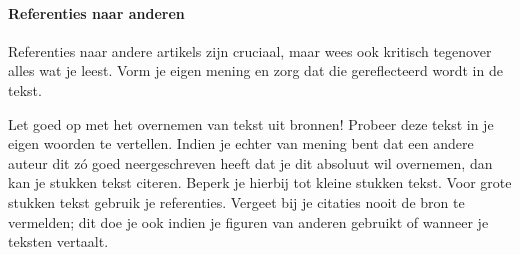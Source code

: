 \documentclass[a4paper]{article}
\begin{document}
\paragraph{Referenties naar anderen}

Referenties naar andere artikels zijn cruciaal, maar wees ook kritisch tegenover alles wat je leest.
Vorm je eigen mening en zorg dat die gereflecteerd wordt in de tekst.

Let goed op met het overnemen van tekst uit bronnen!
Probeer deze tekst in je eigen woorden te vertellen.
Indien je echter van mening bent dat een andere auteur dit z\'o goed neergeschreven heeft dat je dit absoluut wil overnemen, dan kan je stukken tekst citeren.
Beperk je hierbij tot kleine stukken tekst.
Voor grote stukken tekst gebruik je referenties.
Vergeet bij je citaties nooit de bron te vermelden; dit doe je ook indien je figuren van anderen gebruikt of wanneer je teksten vertaalt.



\end{document}
